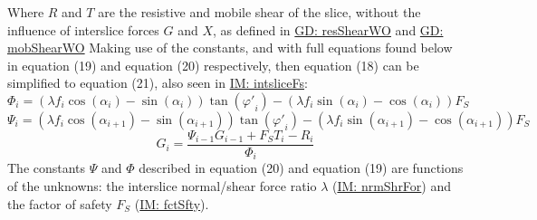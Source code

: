 \documentclass[12pt]{article}
\begin{document}
Where $R$ and $T$ are the resistive and mobile shear of the slice, without the influence of interslice forces $G$ and $X$, as defined in \hyperref[GD:resShearWO]{GD: resShearWO} and \hyperref[GD:mobShearWO]{GD: mobShearWO} Making use of the constants, and with full equations found below in equation (19) and equation (20) respectively, then equation (18) can be simplified to equation (21), also seen in \hyperref[IM:intsliceFs]{IM: intsliceFs}:
\begin{displaymath}
Φ_{i}=\left(λ f_{i} \cos\left(α_{i}\right)-\sin\left(α_{i}\right)\right) \tan\left({φ'}_{i}\right)-\left(λ f_{i} \sin\left(α_{i}\right)-\cos\left(α_{i}\right)\right) {F_{S}}
\end{displaymath}
\begin{displaymath}
Ψ_{i}=\left(λ f_{i} \cos\left(α_{i+1}\right)-\sin\left(α_{i+1}\right)\right) \tan\left({φ'}_{i}\right)-\left(λ f_{i} \sin\left(α_{i+1}\right)-\cos\left(α_{i+1}\right)\right) {F_{S}}
\end{displaymath}
\begin{displaymath}
G_{i}=\frac{Ψ_{i-1} G_{i-1}+{F_{S}} T_{i}-R_{i}}{Φ_{i}}
\end{displaymath}
The constants $Ψ$ and $Φ$ described in equation (20) and equation (19) are functions of the unknowns: the interslice normal/shear force ratio $λ$ (\hyperref[IM:nrmShrFor]{IM: nrmShrFor}) and the factor of safety ${F_{S}}$ (\hyperref[IM:fctSfty]{IM: fctSfty}).
~\newline
\end{document}
